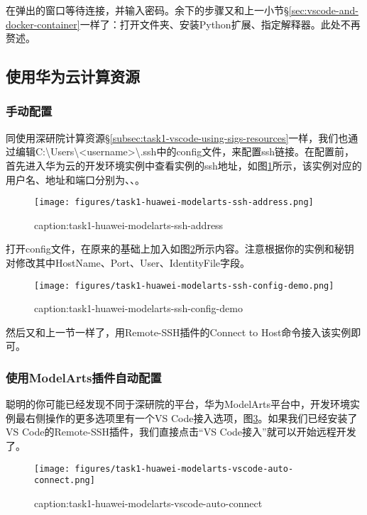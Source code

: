 在弹出的窗口等待连接，并输入密码。余下的步骤又和上一小节\S\ref{sec:vscode-and-docker-container}一样了：打开文件夹、安装Python扩展、指定解释器。此处不再赘述。

\subsection{使用华为云计算资源}

\subsubsection{手动配置}

同使用深研院计算资源\S\ref{subsec:task1-vscode-using-sigs-resources}一样，我们也通过编辑C:\textbackslash Users\textbackslash <username>\textbackslash .ssh中的config文件，来配置ssh链接。在配置前，首先进入华为云的开发环境实例中查看实例的ssh地址，如图\ref{fig:task1-huawei-modelarts-ssh-address}所示，该实例对应的用户名、地址和端口分别为、、。

\begin{figure}[htbp]
	\centering
	\texttt{[image: figures/task1-huawei-modelarts-ssh-address.png]}
	\caption{caption:task1-huawei-modelarts-ssh-address}
	\label{fig:task1-huawei-modelarts-ssh-address}
\end{figure}


打开config文件，在原来的基础上加入如图\ref{fig:task1-huawei-modelarts-ssh-config-demo}所示内容。注意根据你的实例和秘钥对修改其中HostName、Port、User、IdentityFile字段。

\begin{figure}[htbp]
	\centering
	\texttt{[image: figures/task1-huawei-modelarts-ssh-config-demo.png]}
	\caption{caption:task1-huawei-modelarts-ssh-config-demo}
	\label{fig:task1-huawei-modelarts-ssh-config-demo}
\end{figure}

然后又和上一节一样了，用Remote-SSH插件的Connect to Host命令接入该实例即可。

\subsubsection{使用ModelArts插件自动配置}

聪明的你可能已经发现不同于深研院的平台，华为ModelArts平台中，开发环境实例最右侧操作的更多选项里有一个VS Code接入选项，图\ref{fig:task1-huawei-modelarts-vscode-auto-connect}。如果我们已经安装了VS Code的Remote-SSH插件，我们直接点击“VS Code接入”就可以开始远程开发了。
\begin{figure}[htbp]
	\centering
	\texttt{[image: figures/task1-huawei-modelarts-vscode-auto-connect.png]}
	\caption{caption:task1-huawei-modelarts-vscode-auto-connect}
	\label{fig:task1-huawei-modelarts-vscode-auto-connect}
\end{figure}

